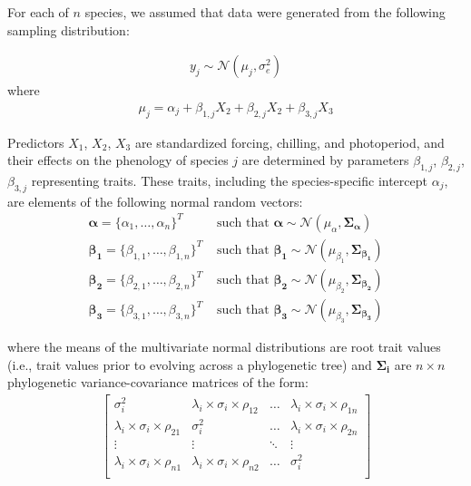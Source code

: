 \documentclass{article}\usepackage[]{graphicx}\usepackage[]{color}
\begin{document}

For each of $n$ species, we assumed that data were generated from the following sampling distribution:

\begin{align}
  \label{modely}
  y_j \sim \mathcal{N}(\mu_j, \sigma_e^2)
\end{align}
where
\begin{align}
  \label{modelmu}
  \mu_j = \alpha_j + \beta_{1,j} X_2 + \beta_{2,j} X_2 + \beta_{3,j} X_3
\end{align}

Predictors $X_1$, $X_2$, $X_3$ are standardized forcing, chilling, and photoperiod, and their effects on the phenology of species $j$ are determined by parameters $\beta_{1,j}$, $\beta_{2,j}$, $\beta_{3,j}$ representing traits. These traits, including the species-specific intercept $\alpha_j$, are elements of the following normal random vectors:
\begin{align}
  \boldsymbol{\alpha} = \{\alpha_1, \ldots, \alpha_n\}^T & \text{ such that }
  \boldsymbol{\alpha} \sim \mathcal{N}(\mu_{\alpha},\boldsymbol{\Sigma_{\alpha}}) \\
  \boldsymbol{\beta_1} =  \{\beta_{1,1}, \ldots, \beta_{1,n}\}^T & \text{ such that }
  \boldsymbol{\beta_1} \sim \mathcal{N}(\mu_{\beta_1},\boldsymbol{\Sigma_{\beta_1}}) \nonumber \\
  \boldsymbol{\beta_2} =  \{\beta_{2,1}, \ldots, \beta_{2,n}\}^T & \text{ such that }
  \boldsymbol{\beta_2} \sim \mathcal{N}(\mu_{\beta_2},\boldsymbol{\Sigma_{\beta_2}}) \nonumber \\
  \boldsymbol{\beta_3} =  \{\beta_{3,1}, \ldots, \beta_{3,n}\}^T & \text{ such that }
  \boldsymbol{\beta_3} \sim \mathcal{N}(\mu_{\beta_3},\boldsymbol{\Sigma_{\beta_3}}) \nonumber
\end{align}

\noindent where the means of the multivariate normal distributions are root trait values (i.e., trait values prior to evolving across a phylogenetic tree) and $\boldsymbol{\Sigma_i}$ are $n \times n$ phylogenetic variance-covariance matrices of the form: \\

\begin{align}
  \label{phymat}
\begin{bmatrix}
  \sigma^2_i & \lambda_i \times \sigma_{i} \times \rho_{12} & \ldots & \lambda_i \times \sigma_{i} \times \rho_{1n} \\
  \lambda_i \times \sigma_i \times \rho_{21} & \sigma^2_i & \ldots & \lambda_i \times \sigma_{i} \times \rho_{2n} \\
  \vdots & \vdots & \ddots & \vdots \\
  \lambda_i \times \sigma_i \times \rho_{n1} & \lambda_i \times \sigma_i \times \rho_{n2} & \ldots & \sigma^2_i \\
\end{bmatrix}
\end{align}
\end{document}
